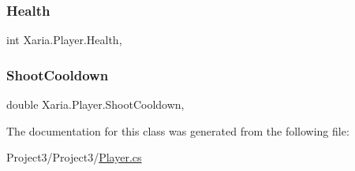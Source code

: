 \subsubsection{\texorpdfstring{Health}{Health}}
{\footnotesize\ttfamily int Xaria.\+Player.\+Health\hspace{0.3cm}{\ttfamily [get]}, {\ttfamily [set]}}

\mbox{\label{classXaria_1_1Player_a0139bb987403bdbe4b795a03be8d2108}} 
\subsubsection{\texorpdfstring{Shoot\+Cooldown}{ShootCooldown}}
{\footnotesize\ttfamily double Xaria.\+Player.\+Shoot\+Cooldown\hspace{0.3cm}{\ttfamily [get]}, {\ttfamily [set]}}



The documentation for this class was generated from the following file\+:\begin{DoxyCompactItemize}
\item 
Project3/\+Project3/\hyperlink{Player_8cs}{Player.\+cs}\end{DoxyCompactItemize}
